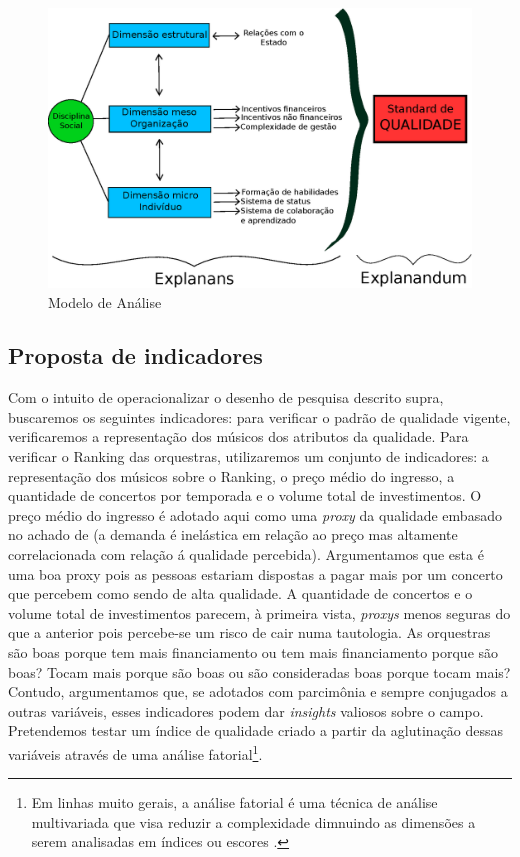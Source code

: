 \documentclass[a4paper, 12pt, openright, oneside, german, french, english, brazil]{abntex2}
\begin{document}
	\begin{figure}[!h]
		\centering
		\caption{Modelo de Análise}
		\label{modelo-analise}
		\includegraphics[scale=.8]{modelo_analise_tese.eps}
	\end{figure}


	\subsection{Proposta de indicadores}

	Com o intuito de operacionalizar o desenho de pesquisa descrito supra, buscaremos os seguintes indicadores: para verificar o padrão de qualidade vigente, verificaremos a representação dos músicos dos atributos da qualidade. Para verificar o Ranking das orquestras, utilizaremos um conjunto de indicadores: a representação dos músicos sobre o Ranking, o preço médio do ingresso, a quantidade de concertos por temporada e o volume total de investimentos. O preço médio do ingresso é adotado aqui como uma \textit{proxy} da qualidade embasado no achado de  (a demanda é inelástica em relação ao preço mas altamente correlacionada com relação á qualidade percebida). Argumentamos que esta é uma boa proxy pois as pessoas estariam dispostas a pagar mais por um concerto que percebem como sendo de alta qualidade. A quantidade de concertos e o volume total de investimentos parecem, à primeira vista, \textit{proxys} menos seguras do que a anterior pois percebe-se um risco de cair numa tautologia. As orquestras são boas porque tem mais financiamento ou tem mais financiamento porque são boas? Tocam mais porque são boas ou são consideradas boas porque tocam mais? Contudo, argumentamos que, se adotados com parcimônia e sempre conjugados a outras variáveis, esses indicadores podem dar \textit{insights} valiosos sobre o campo. Pretendemos testar um índice de qualidade criado a partir da aglutinação dessas variáveis através de uma análise fatorial\footnote{Em linhas muito gerais, a análise fatorial é uma técnica de análise multivariada que visa reduzir a complexidade dimnuindo as dimensões a serem analisadas em índices ou escores \cite{mingoti2005analise}.}.
\end{document}
